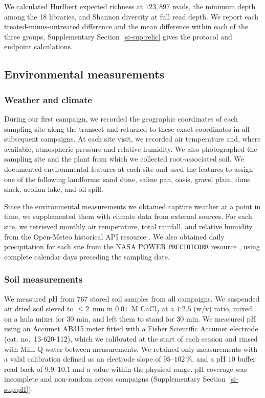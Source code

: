 \documentclass[fleqn,10pt,numbers]{olplainarticle}
\begin{document}
We calculated Hurlbert expected richness at $123{,}897$ reads, the minimum
depth among the 18 libraries, and Shannon diversity at full read depth. We report each treated-minus-untreated difference and
the mean difference within each of the three groups. Supplementary
Section~\ref{si-sup:relic} gives the protocol and endpoint calculations.

\subsection*{Environmental measurements}
\subsubsection*{Weather and climate}\label{sec:envmeasurements}
During our first campaign, we recorded the geographic coordinates of each sampling site along the transect and returned to these exact coordinates in all subsequent campaigns. At each site visit, we recorded air temperature and, where available, atmospheric pressure and relative humidity. We also photographed the sampling site and the plant from which we collected root-associated soil. We documented environmental features at each site and used the features to assign one of the following landforms: sand dune, saline pan, oasis, gravel plain, dune slack, aeolian lake, and oil spill.

Since the environmental measurements we obtained capture weather at a point in time, we supplemented them with climate data from external sources. For each site, we retrieved monthly air temperature, total rainfall, and relative humidity from the Open-Meteo historical API resource \cite{openmeteo}. We also obtained daily precipitation for each site from the NASA POWER \texttt{PRECTOTCORR} resource \cite{nasa_power_2024}, using complete calendar days preceding the sampling date.

\subsubsection*{Soil measurements}
We measured pH from $767$ stored soil samples from all campaigns. We suspended air dried soil sieved to $\le 2$~mm in $0.01$~M CaCl$_2$ at a $1$:$2.5$ (w/v) ratio, mixed on a hula mixer for 30 min, and left them to stand for 30 min. We measured pH using an Accumet AB315 meter fitted with a Fisher Scientific Accumet electrode (cat. no.\ 13-620-112), which we calibrated at the start of each session and rinsed with Milli-Q water between measurements. We retained only measurements with a valid calibration defined as an electrode slope of $95$--$102\,\%$, and a pH $10$ buffer read-back of $9.9$--$10.1$ and a value within the physical range. pH coverage was incomplete and non-random across campaigns (Supplementary Section~\ref{si-sup:pH}).
\end{document}
